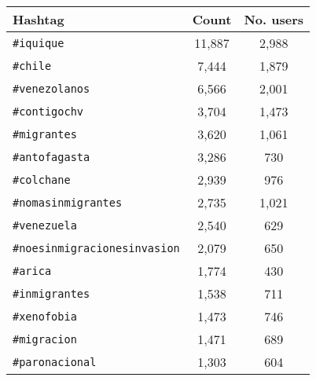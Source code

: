 %
    
    \begin{tabular}{lcc}
        \toprule\toprule
        Hashtag & Count & No. users\\ \midrule
        \texttt{\#iquique} & 11,887 & 2,988 \\ 
        \texttt{\#chile} &  7,444 & 1,879 \\ 
        \texttt{\#venezolanos} &  6,566 & 2,001 \\ 
        \texttt{\#contigochv} &  3,704 & 1,473 \\
        \texttt{\#migrantes} & 3,620 & 1,061 \\ 
        \texttt{\#antofagasta} & 3,286 & 730 \\ 
        \texttt{\#colchane} & 2,939 & 976 \\ 
        \texttt{\#nomasinmigrantes} & 2,735 & 1,021 \\
        \texttt{\#venezuela} & 2,540 & 629 \\ 
        \texttt{\#noesinmigracionesinvasion} & 2,079 & 650 \\
        \texttt{\#arica} & 1,774& 430 \\ 
        \texttt{\#inmigrantes} & 1,538 & 711 \\ 
        \texttt{\#xenofobia} & 1,473 & 746 \\
        \texttt{\#migracion} & 1,471 & 689 \\
        \texttt{\#paronacional} & 1,303 & 604 \\
        \bottomrule\bottomrule
    \end{tabular}

%